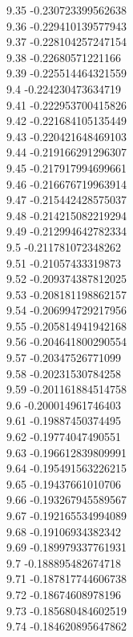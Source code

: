 {9.35	-0.230723399562638\\
9.36	-0.229410139577943\\
9.37	-0.228104257247154\\
9.38	-0.22680571221166\\
9.39	-0.225514464321559\\
9.4	-0.224230473634719\\
9.41	-0.222953700415826\\
9.42	-0.221684105135449\\
9.43	-0.220421648469103\\
9.44	-0.219166291296307\\
9.45	-0.217917994699661\\
9.46	-0.216676719963914\\
9.47	-0.215442428575037\\
9.48	-0.214215082219294\\
9.49	-0.212994642782334\\
9.5	-0.211781072348262\\
9.51	-0.21057433319873\\
9.52	-0.209374387812025\\
9.53	-0.208181198862157\\
9.54	-0.206994729217956\\
9.55	-0.205814941942168\\
9.56	-0.204641800290554\\
9.57	-0.20347526771099\\
9.58	-0.20231530784258\\
9.59	-0.201161884514758\\
9.6	-0.200014961746403\\
9.61	-0.19887450374495\\
9.62	-0.19774047490551\\
9.63	-0.196612839809991\\
9.64	-0.195491563226215\\
9.65	-0.19437661010706\\
9.66	-0.193267945589567\\
9.67	-0.192165534994089\\
9.68	-0.19106934382342\\
9.69	-0.189979337761931\\
9.7	-0.188895482674718\\
9.71	-0.187817744606738\\
9.72	-0.18674608978196\\
9.73	-0.185680484602519\\
9.74	-0.184620895647862\\
}
